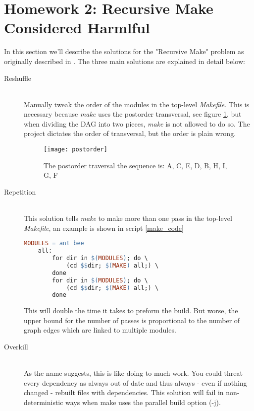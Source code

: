 
\section[Homework 2]{Homework 2: Recursive Make Considered Harmlful}

In this section we'll describe the solutions for the "Recursive Make" problem as originally described in \cite{make_harmful}.
The three main solutions are explained in detail below:
\begin{description}
	  \item[Reshuffle] \hfill \\
	  Manually tweak the order of the modules in the top-level \textit{Makefile}. This is necessary because \textit{make} uses the postorder transversal, see figure \ref{fig:postorder}, but when dividing the DAG into two pieces, \textit{make} is not allowed to do so. The project dictates the order of transversal, but the order is plain wrong.  \hfill \\
	\begin{figure}[H]
		\centering
		\texttt{[image: postorder]}
		\caption{The postorder traversal the sequence is: A, C, E, D, B, H, I, G, F \cite{postorder}}
		\label{fig:postorder}
	\end{figure}
	  \item[Repetition] \hfill \\
	  This solution tells \textit{make} to make more than one pass in the top-level \textit{Makefile}, an example is shown in script \ref{make_code} \hfill \\
	\begin{lstlisting}[frame=single, language=make, caption={An example Makefile using repetition.}, label={make_code}]
	 MODULES = ant bee 
 	all:
    	for dir in $(MODULES); do \
      		(cd $$dir; $(MAKE) all;) \
    	done
    	for dir in $(MODULES); do \
      		(cd $$dir; $(MAKE) all;) \
    	done 
	\end{lstlisting}
	This will double the time it takes to preform the build. But worse, the upper bound for the number of passes is proportional to the number of graph edges which are linked to multiple modules.
	
	  \item[Overkill] \hfill \\
	As the name suggests, this is like doing to much work. You could threat every dependency as always out of date and thus always - even if nothing changed - rebuilt files with dependencies. This solution will fail in non-deterministic ways when make uses the parallel build option (-j).  
	\end{description}
	
